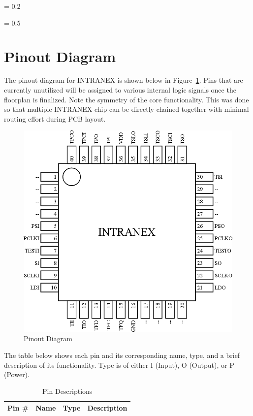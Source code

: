 \documentclass{article}
\begin{document}

\parskip = 0.2\baselineskip
\newpage
\tableofcontents
\newpage
\listoffigures
\listoftables
\lstlistoflistings
\parskip = 0.5\baselineskip
\newpage
\section{Pinout Diagram}

The pinout diagram for INTRANEX is shown below in Figure~\ref{fig:pinout}.
Pins that are currently unutilized will be assigned to various internal logic
signals once the floorplan is finalized. Note the symmetry of the core
functionality.  This was done so that multiple INTRANEX chip can be directly
chained together with minimal routing effort during PCB layout.

\begin{figure}[H]
    \centering
    \includegraphics[width=\linewidth]{../pinout/pinout.png}
    \caption{Pinout Diagram}
    \label{fig:pinout}
\end{figure}

\newpage
The table below shows each pin and its corresponding name, type, and a brief
description of its functionality. Type is of either I (Input), O (Output), or P
(Power).
\begin{table}[H]
    \begin{tabularx}{\textwidth}{|l|l|c|X|}
        \hline
        \textbf{Pin \#} & \textbf{Name} & \textbf{Type} & \textbf{Description} \\
        \hline
        
    \end{tabularx}
    \caption{Pin Descriptions}
\end{table}
\end{document}
